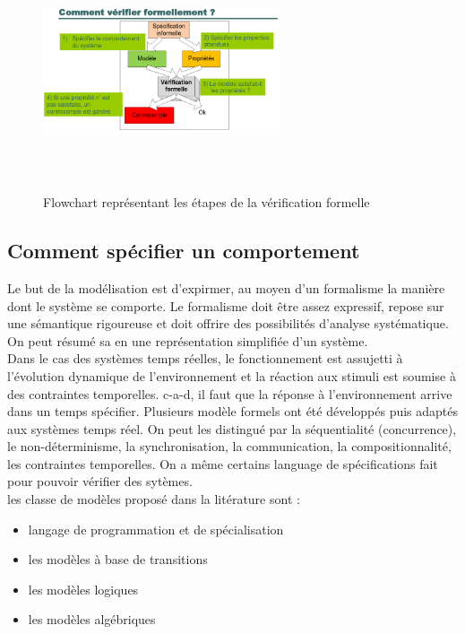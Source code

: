 \documentclass[oneside]{book}
\begin{document}
    \begin{figure}[!ht]
    	\centering
    	\includegraphics[width = 7cm, height = 7cm, keepaspectratio]{Images/flowchart_verification.png}
    	\caption{Flowchart représentant les étapes de la vérification formelle}
    	\label{fig:FlowchartVerification}
    \end{figure}
    
    \subsection{Comment spécifier un comportement}
    Le but de la modélisation est d'expirmer, au moyen d'un formalisme la manière dont le système se comporte. Le formalisme doit être assez expressif, repose sur une sémantique rigoureuse et doit offrire des possibilités d'analyse systématique. On peut résumé sa en une représentation simplifiée d'un système.\\
    
    Dans le cas des systèmes temps réelles, le fonctionnement est assujetti à l'évolution dynamique de l'environnement et la réaction aux stimuli est soumise à des contraintes temporelles. c-a-d, il faut que la réponse à l'environnement arrive dans un temps spécifier. Plusieurs modèle formels ont été développés puis adaptés aux systèmes temps réel. On peut les distingué par la séquentialité (concurrence), le non-déterminisme, la synchronisation, la communication, la compositionnalité, les contraintes temporelles. On a même certains language de spécifications fait pour pouvoir vérifier des sytèmes.\\
    
    les classe de modèles proposé dans la litérature sont :
    \begin{itemize}
        \item langage de programmation et de spécialisation
        \item les modèles à base de transitions
        \item les modèles logiques
        \item les modèles algébriques
    \end{itemize}
    
\end{document}
